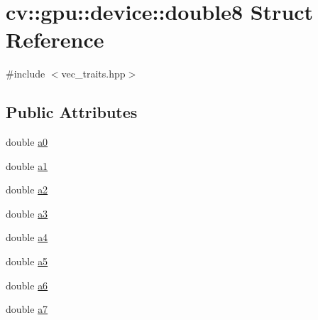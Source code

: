 \hypertarget{structcv_1_1gpu_1_1device_1_1double8}{\section{cv\-:\-:gpu\-:\-:device\-:\-:double8 Struct Reference}
\label{structcv_1_1gpu_1_1device_1_1double8}
}


{\ttfamily \#include $<$vec\-\_\-traits.\-hpp$>$}

\subsection*{Public Attributes}
\begin{DoxyCompactItemize}
\item 
double \hyperlink{structcv_1_1gpu_1_1device_1_1double8_a4e6fb18e88872c54f5c0efbb79902d46}{a0}
\item 
double \hyperlink{structcv_1_1gpu_1_1device_1_1double8_acad2fadf1463692a5b434e418e7605ef}{a1}
\item 
double \hyperlink{structcv_1_1gpu_1_1device_1_1double8_a34aedd24bd738d64c5b79037a4719651}{a2}
\item 
double \hyperlink{structcv_1_1gpu_1_1device_1_1double8_a65d865da9d081bc5cc23337b55a24dbc}{a3}
\item 
double \hyperlink{structcv_1_1gpu_1_1device_1_1double8_a05d45f0a434058b1c12785fabe6057b8}{a4}
\item 
double \hyperlink{structcv_1_1gpu_1_1device_1_1double8_a2d7d285245ec262d271af75e9b76e9b1}{a5}
\item 
double \hyperlink{structcv_1_1gpu_1_1device_1_1double8_a92362f9376ee46b3fff7c11ecc1bd4ed}{a6}
\item 
double \hyperlink{structcv_1_1gpu_1_1device_1_1double8_acda70907989f0200d91fd5c7bcef05e5}{a7}
\end{DoxyCompactItemize}


